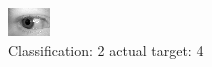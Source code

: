 \begin{figure}[h!]
\begin{center}
\includegraphics[width=0.60\columnwidth]{figures/ID715_class_2_target_4.png}
\end{center}
\caption{ Classification: 2 actual target: 4}
\label{fig:ID715_class_2_target_4}
\end{figure}
